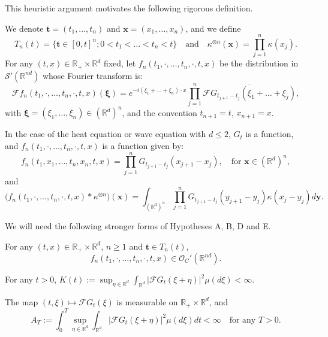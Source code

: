 \documentclass[12pt]{article}
\def\cF{\mathcal{F}}
\def\cO{\mathcal{O}}
\def\cS{\mathcal{S}}
\def\bR{\mathbb{R}}
\def\k{\kappa}
\begin{document}
\medskip

This heuristic argument motivates the following rigorous definition. 


We denote $\pmb{t}=(t_1,\ldots,t_n)$ and  $\pmb{x}=(x_1,\ldots,x_n)$, and we define
\[
T_n(t)=\{\pmb{t} \in [0,t]^n; 0<t_1<\ldots<t_n<t\} \quad \mbox{and} \quad \k^{\otimes n}(\pmb{x})=\prod_{j=1}^n\k(x_j).
\] 
For any $(t,x) \in \bR_{+} \times \bR^d$ fixed, let
$f_n(t_1,\cdot,\ldots,t_n,\cdot,t,x)$ be the distribution in $\cS'(\bR^{nd})$ whose Fourier transform is:
\[
\cF f_n(t_1,\cdot,\ldots,t_n,\cdot,t,x)(\pmb{\xi})=e^{-i(\xi_1+\ldots+\xi_n)\cdot x} \prod_{j=1}^{n}\overline{\cF G_{t_{j+1}-t_j}(\xi_1+\ldots+\xi_j)},
\]
with $\pmb{\xi}=(\xi_1,\ldots,\xi_n) \in (\bR^d)^n$, and the convention
 $t_{n+1}=t$, $x_{n+1}=x$. 
 
 
 In the case of the heat equation or wave equation with $d\leq 2$, $G_t$ is a function, and $f_n(t_1,\cdot,\ldots,t_n,\cdot,t,x)$ is a function given by:
\begin{equation}
\label{def-fn-func}
f_n(t_1,x_1,\ldots,t_n,x_n,t,x)=\prod_{j=1}^{n}G_{t_{j+1}-t_j}(x_{j+1}-x_j), \quad \mbox{for  $\pmb{x}\in (\bR^d)^n$},
\end{equation}
and 
\[
\big(f_n(t_1,\cdot,\ldots,t_n,\cdot,t,x)* \k^{\otimes n}\big)(\pmb{x}) =\int_{(\bR^d)^n}\prod_{j=1}^{n}G_{t_{j+1}-t_j}(y_{j+1}-y_j) \k(x_j-y_j) d\pmb{y}.
\]
 \medskip
 
We will need the following stronger forms of Hypotheses A, B, D and E.

\medskip

 For any $(t,x)\in \bR_{+} \times  \bR^d$, $n\geq 1$ and $\pmb{t} \in T_n(t)$,
\[
f_n(t_1,\cdot,\ldots,t_n,\cdot,t,x) \in \cO_{C}'(\bR^{nd}).
\]

\medskip

 For any $t>0$,
$K(t):= \sup_{\eta \in \bR^d} \int_{\bR^d}|\cF G_t(\xi+\eta)|^2 \mu(d\xi)<\infty$.\\


\medskip

 The map $(t,\xi)\mapsto \cF G_t(\xi)$ is measurable on $\bR_{+} \times \bR^d$, and 
\begin{equation}
\label{def-AT}
A_T:=\int_0^T \sup_{\eta \in \bR^d} \int_{\bR^d}|\cF G_t(\xi+\eta)|^2 \mu(d\xi)dt<\infty \quad \mbox{for any $T>0$}.
\end{equation}

\medskip
\end{document}

